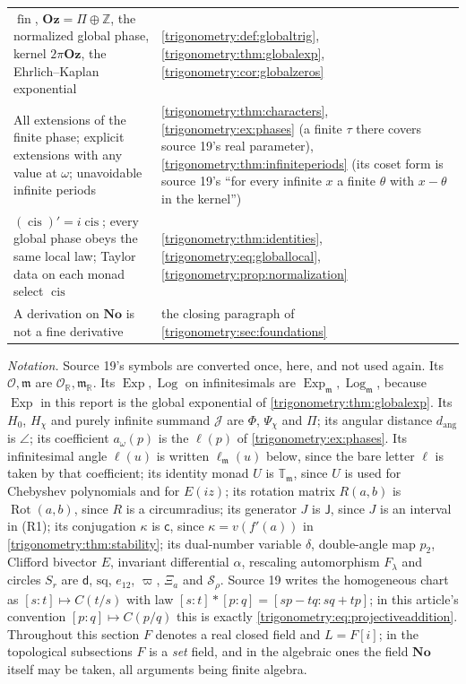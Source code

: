 \documentclass[11pt,letterpaper]{article}
\numberwithin{equation}{section}
\theoremstyle{definition}
\theoremstyle{remark}
\newcommand{\No}{\mathbf{No}}
\newcommand{\Oz}{\mathbf{Oz}}
\newcommand{\R}{\mathbb R}
\newcommand{\Z}{\mathbb Z}
\newcommand{\OO}{\mathcal O}
\newcommand{\mm}{\mathfrak m}
\newcommand{\TT}{\mathbb T}
\newcommand{\fin}{\operatorname{fin}}
\newcommand{\cis}{\operatorname{cis}}
\newcommand{\Exp}{\operatorname{Exp}}
\newcommand{\Ex}{\operatorname{Exp}_{\mm}}
\newcommand{\Logm}{\operatorname{Log}_{\mm}}
\newcommand{\Rot}{\operatorname{Rot}}
\newcommand{\ellm}{\ell_{\mm}}
\newcommand{\Tm}{\TT_{\mm}}
\begin{document}
\begin{center}
\begin{longtable}{L{0.47\textwidth}L{0.45\textwidth}}
$\fin$, $\Oz=\Pi\oplus\Z$, the normalized global phase, kernel $2\pi\Oz$, the Ehrlich--Kaplan exponential & \cref{trigonometry:def:globaltrig}, \cref{trigonometry:thm:globalexp}, \cref{trigonometry:cor:globalzeros}\\
All extensions of the finite phase; explicit extensions with any value at $\omega$; unavoidable infinite periods & \cref{trigonometry:thm:characters}, \cref{trigonometry:ex:phases} (a finite $\tau$ there covers source 19's real parameter), \cref{trigonometry:thm:infiniteperiods} (its coset form is source 19's ``for every infinite $x$ a finite $\theta$ with $x-\theta$ in the kernel'')\\
$(\cis)'=i\cis$; every global phase obeys the same local law; Taylor data on each monad select $\cis$ & \cref{trigonometry:thm:identities}, \cref{trigonometry:eq:globallocal}, \cref{trigonometry:prop:normalization}\\
A derivation on $\No$ is not a fine derivative & the closing paragraph of \cref{trigonometry:sec:foundations}\\
\bottomrule
\end{longtable}
\end{center}

\emph{Notation.} Source 19's symbols are converted once, here, and not used again. Its $\OO,\mm$ are
$\OO_{\R},\mm_{\R}$. Its $\Exp,\operatorname{Log}$ on infinitesimals are $\Ex,\Logm$, because $\Exp$ in this report
is the global exponential of \cref{trigonometry:thm:globalexp}. Its $H_0$, $H_\chi$ and
purely infinite summand $\mathcal J$ are $\Phi$, $\Psi_\chi$ and $\Pi$; its angular distance
$d_{\mathrm{ang}}$ is $\angle$; its coefficient $a_\omega(p)$ is the $\ell(p)$ of
\cref{trigonometry:ex:phases}. Its infinitesimal angle $\ell(u)$ is written $\ellm(u)$ below, since
the bare letter $\ell$ is taken by that coefficient; its identity monad $U$ is $\Tm$, since $U$ is
used for Chebyshev polynomials and for $E(iz)$; its rotation matrix $R(a,b)$ is $\Rot(a,b)$, since
$R$ is a circumradius; its generator $J$ is $\mathsf J$, since $J$ is an interval in (R1); its
conjugation $\kappa$ is $\mathsf c$, since $\kappa=v(f'(a))$ in \cref{trigonometry:thm:stability};
its dual-number variable $\delta$, double-angle map $p_2$, Clifford bivector $E$, invariant
differential $\alpha$, rescaling automorphism $F_\lambda$ and circles $S_r$ are $\mathsf d$,
$\mathrm{sq}$, $e_{12}$, $\varpi$, $\Xi_a$ and $\mathcal S_\rho$. Source 19 writes the homogeneous
chart as $[s:t]\mapsto C(t/s)$ with law $[s:t]*[p:q]=[sp-tq:sq+tp]$; in this article's convention
$[p:q]\mapsto C(p/q)$ this is exactly \cref{trigonometry:eq:projectiveaddition}. Throughout this
section $F$ denotes a real closed field and $L=F[i]$; in the topological subsections $F$ is a
\emph{set} field, and in the algebraic ones the field $\No$ itself may be taken, all arguments being
finite algebra.
\end{document}
